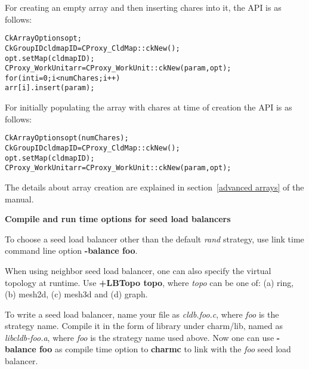 For creating an empty array and then inserting chares into it, the API is as follows:

\begin{alltt}
  CkArrayOptions opt;
  CkGroupID cldmapID = CProxy_CldMap::ckNew();
  opt.setMap(cldmapID);
  CProxy_WorkUnit arr = CProxy_WorkUnit::ckNew(param, opt); 
  for (int i=0; i<numChares; i++) 
    arr[i].insert(param);
\end{alltt}

For initially populating the array with chares at time of creation the API is as follows:
\begin{alltt}
  CkArrayOptions opt(numChares);
  CkGroupID cldmapID = CProxy_CldMap::ckNew();
  opt.setMap(cldmapID);
  CProxy_WorkUnit arr = CProxy_WorkUnit::ckNew(param, opt); 
\end{alltt}

The details about array creation are explained in section~\ref{advanced arrays} of the manual.

{\bf Compile and run time options for seed load balancers}

To choose a seed load balancer other than the default {\em rand} strategy,
use link time command line option {\bf -balance foo}. 

When using {\rm neighbor} seed load balancer, one can also specify
the virtual topology at runtime. Use {\bf +LBTopo topo}, where {\em topo}
can be one of: (a) ring, (b) mesh2d, (c) mesh3d and (d) graph.

To write a seed load balancer, name your file as {\em cldb.foo.c},
where {\em foo} is the strategy name.  Compile it in the form of library
under charm/lib, named as {\em libcldb-foo.a}, where {\em foo} is the strategy 
name used above. Now one can use {\bf -balance foo} as compile time option
to {\bf charmc} to link with the {\em foo} seed load balancer.
